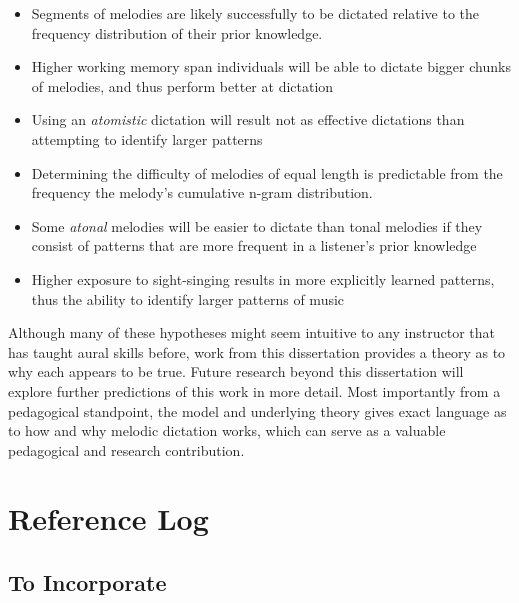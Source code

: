 \documentclass[]{book}
\providecommand{\tightlist}{%
  \setlength{\itemsep}{0pt}\setlength{\parskip}{0pt}}
\theoremstyle{definition}
\theoremstyle{definition}
\theoremstyle{definition}
\theoremstyle{remark}
\begin{document}
\begin{itemize}
\tightlist
\item
  Segments of melodies are likely successfully to be dictated relative
  to the frequency distribution of their prior knowledge.
\item
  Higher working memory span individuals will be able to dictate bigger
  chunks of melodies, and thus perform better at dictation
\item
  Using an \emph{atomistic} dictation will result not as effective
  dictations than attempting to identify larger patterns
\item
  Determining the difficulty of melodies of equal length is predictable
  from the frequency the melody's cumulative n-gram distribution.
\item
  Some \emph{atonal} melodies will be easier to dictate than tonal
  melodies if they consist of patterns that are more frequent in a
  listener's prior knowledge
\item
  Higher exposure to sight-singing results in more explicitly learned
  patterns, thus the ability to identify larger patterns of music
\end{itemize}

Although many of these hypotheses might seem intuitive to any instructor
that has taught aural skills before, work from this dissertation
provides a theory as to why each appears to be true. Future research
beyond this dissertation will explore further predictions of this work
in more detail. Most importantly from a pedagogical standpoint, the
model and underlying theory gives exact language as to how and why
melodic dictation works, which can serve as a valuable pedagogical and
research contribution.

\hypertarget{reference-log}{%
\chapter{Reference Log}\label{reference-log}}

\hypertarget{to-incorporate}{%
\section{To Incorporate}\label{to-incorporate}}
\end{document}
